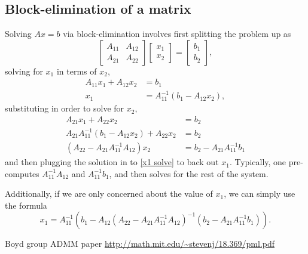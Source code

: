 \documentclass{article}
\begin{document}
\begin{appendix}
\subsection{Block-elimination of a matrix}\label{block elim}
Solving $Ax=b$ via block-elimination involves first splitting the problem up as
    \begin{equation}
    \begin{bmatrix} A_{11} & A_{12} \\ A_{21} & A_{22} \end{bmatrix} 
    \begin{bmatrix} x_1 \\ x_2 \end{bmatrix} = 
    \begin{bmatrix} b_1 \\ b_2 \end{bmatrix},
    \end{equation}
    solving for $x_1$ in terms of $x_2$, 
    \begin{subequations}\begin{align}
    A_{11} x_1 + A_{12} x_2 &= b_1 \\
    x_1 &= A_{11}^{-1} (b_1 - A_{12} x_2), \label{x1 solve}
    \end{align}\end{subequations}
    substituting in order to solve for $x_2$,
    \begin{subequations}\begin{align}
    A_{21} x_1 + A_{22} x_2 &= b_2 \\
    A_{21} A_{11}^{-1} (b_1 - A_{12} x_2) + A_{22} x_2 &= b_2 \\
    (A_{22} - A_{21} A_{11}^{-1} A_{12}) x_2 &= b_2 - A_{21} A_{11}^{-1} b_1
    \end{align}\end{subequations}
    and then plugging the solution in to \eqref{x1 solve} to back out $x_1$.
Typically, one pre-computes $A_{11}^{-1} A_{12}$ and $A_{11}^{-1} b_1$, 
    and then solves for the rest of the system.

Additionally, if we are only concerned about the value of $x_1$,
    we can simply use the formula
    \begin{equation}
    x_1 = A_{11}^{-1} (b_1 - A_{12} 
        (A_{22} - A_{21} A_{11}^{-1} A_{12})^{-1}
        (b_2 - A_{21} A_{11}^{-1} b_1)).
    \end{equation}
\end{appendix}
\begin{thebibliography}{99}
 Boyd group ADMM paper
 \url{http://math.mit.edu/~stevenj/18.369/pml.pdf}
\end{thebibliography}
\end{document}

